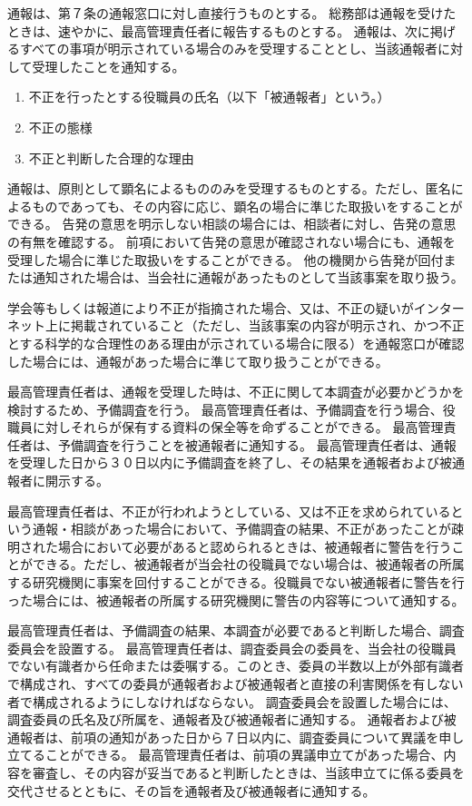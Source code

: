 \documentclass[10pt,a4paper,uplatex]{jsarticle}
\begin{document}
通報は、第７条の通報窓口に対し直接行うものとする。
\term 総務部は通報を受けたときは、速やかに、最高管理責任者に報告するものとする。
\term 通報は、次に掲げるすべての事項が明示されている場合のみを受理することとし、当該通報者に対して受理したことを通知する。
\begin{enumerate}
	\item 不正を行ったとする役職員の氏名（以下「被通報者」という。）
	\item 不正の態様
	\item 不正と判断した合理的な理由
\end{enumerate}
\term 通報は、原則として顕名によるもののみを受理するものとする。ただし、匿名によるものであっても、その内容に応じ、顕名の場合に準じた取扱いをすることができる。
\term 告発の意思を明示しない相談の場合には、相談者に対し、告発の意思の有無を確認する。
\term 前項において告発の意思が確認されない場合にも、通報を受理した場合に準じた取扱いをすることができる。
\term 他の機関から告発が回付または通知された場合は、当会社に通報があったものとして当該事案を取り扱う。

学会等もしくは報道により不正が指摘された場合、又は、不正の疑いがインターネット上に掲載されていること（ただし、当該事案の内容が明示され、かつ不正とする科学的な合理性のある理由が示されている場合に限る）を通報窓口が確認した場合には、通報があった場合に準じて取り扱うことができる。　

最高管理責任者は、通報を受理した時は、不正に関して本調査が必要かどうかを検討するため、予備調査を行う。
\term 最高管理責任者は、予備調査を行う場合、役職員に対しそれらが保有する資料の保全等を命ずることができる。
\term 最高管理責任者は、予備調査を行うことを被通報者に通知する。
\term 最高管理責任者は、通報を受理した日から３０日以内に予備調査を終了し、その結果を通報者および被通報者に開示する。

最高管理責任者は、不正が行われようとしている、又は不正を求められているという通報・相談があった場合において、予備調査の結果、不正があったことが疎明された場合において必要があると認められるときは、被通報者に警告を行うことができる。ただし、被通報者が当会社の役職員でない場合は、被通報者の所属する研究機関に事案を回付することができる。役職員でない被通報者に警告を行った場合には、被通報者の所属する研究機関に警告の内容等について通知する。

最高管理責任者は、予備調査の結果、本調査が必要であると判断した場合、調査委員会を設置する。
\term 最高管理責任者は、調査委員会の委員を、当会社の役職員でない有識者から任命または委嘱する。このとき、委員の半数以上が外部有識者で構成され、すべての委員が通報者および被通報者と直接の利害関係を有しない者で構成されるようにしなければならない。
\term 調査委員会を設置した場合には、調査委員の氏名及び所属を、通報者及び被通報者に通知する。
\term 通報者および被通報者は、前項の通知があった日から７日以内に、調査委員について異議を申し立てることができる。
\term 最高管理責任者は、前項の異議申立てがあった場合、内容を審査し、その内容が妥当であると判断したときは、当該申立てに係る委員を交代させるとともに、その旨を通報者及び被通報者に通知する。
\end{document}
